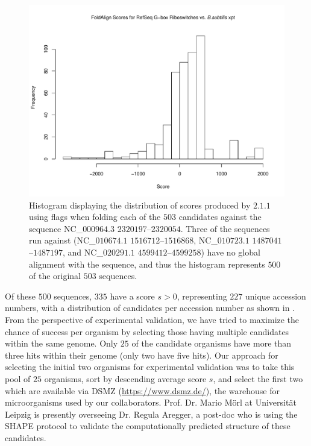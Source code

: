 \begin{figure}[!ht]
\centering
\includegraphics[width=.9\textwidth]{Figures/Ribofinder/histogramFoldalignCandidatesVsXpt.pdf}
\caption[Histogram displaying the distribution of scores produced by \foldalign]{Histogram displaying the distribution of scores produced by \foldalign
$2.1.1$ using flags  when folding each of
the $503$ candidates against the \Bsxpt sequence NC\_$000964.3$ $2320197$--$2320054$.
Three of the sequences run against \foldalign (NC\_$010674.1$ $1516712$--$1516868$,
NC\_$010723.1$ $1487041$--$1487197$, and NC\_$020291.1$ $4599412$--$4599258$) have no global
alignment with the \Bsxpt sequence, and thus the histogram represents $500$ of the
original $503$ sequences.}
\label{fig:rfinder:histogramFoldalignCandidatesVsXpt}
\end{figure}

Of these $500$ sequences, $335$ have a \foldalign score $s > 0$, representing $227$
unique accession numbers, with a distribution of candidates per accession number
as shown in . From
the perspective of experimental validation, we have tried to maximize the chance
of success per organism by selecting those having multiple candidates within the
same genome. Only $25$ of the candidate organisms have more than three hits within
their genome (only two have five hits). Our approach for selecting the initial
two organisms for experimental validation was to take this pool of $25$ organisms,
sort by descending average score $s$, and select the first two which are available
via DSMZ (\url{https://www.dsmz.de/}), the warehouse for microorganisms used by
our collaborators. Prof. Dr. Mario M\"orl at Universit\"at Leipzig is presently
overseeing Dr. Regula Aregger, a post-doc who is using the SHAPE protocol
\citep{wilkinson:2006vd} to
validate the computationally predicted structure of these candidates.


